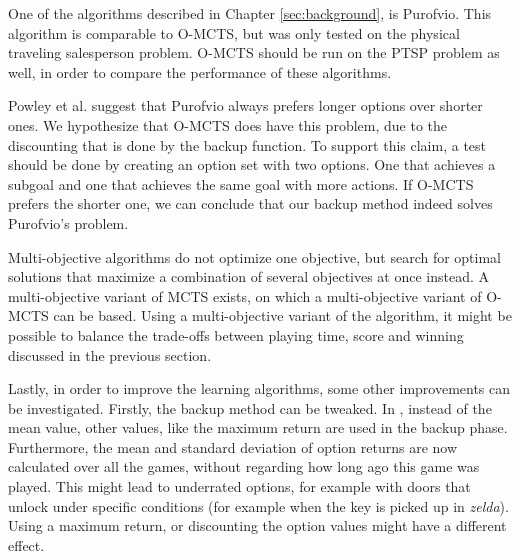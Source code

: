 One of the algorithms described in Chapter \ref{sec:background}, is Purofvio.
This algorithm is comparable to O-MCTS, but was only tested on the physical
traveling salesperson problem. O-MCTS should be run on the PTSP problem as well,
in order to compare the performance of these algorithms.

Powley et al. suggest that Purofvio always prefers longer options over shorter
ones. We hypothesize that O-MCTS does have this problem, due to the discounting
that is done by the backup function.  To support this claim, a test should be
done by creating an option set with two options.  One that achieves a subgoal
and one that achieves the same goal with more actions. If O-MCTS prefers the
shorter one, we can conclude that our backup method indeed solves Purofvio's
problem.

Multi-objective algorithms do not optimize one objective, but search for 
optimal solutions that maximize a combination of several objectives at once
instead. A multi-objective variant of MCTS exists, on which a multi-objective
variant of O-MCTS can be based. Using a multi-objective variant of the
algorithm, it might be possible to balance the trade-offs between playing time,
score and winning discussed in the previous section. 

Lastly, in order to improve the learning algorithms, some other improvements can be
investigated. Firstly, the backup method can be tweaked. In
\cite{coulom2007efficient}, instead of the mean value, other values, like the
maximum return are used in the backup phase. Furthermore, the mean and standard
deviation of option returns are now calculated over all the games, without
regarding how long ago this game was played. This might lead to underrated
options, for example with doors that unlock under specific conditions (for
example when the key is picked up in \textit{zelda}).  Using a maximum return,
or discounting the option values might have a different effect.

